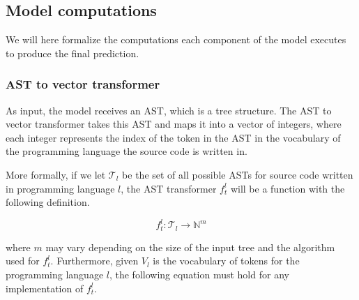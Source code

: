 \subsection{Model computations}
We will here formalize the computations each component of the model executes to
produce the final prediction.
\subsubsection{AST to vector transformer}
As input, the model receives an AST, which is a tree structure. The AST to
vector transformer takes this AST and maps it into a vector of integers, where
each integer represents the index of the token in the AST in the vocabulary of
the programming language the source code is written in.

More formally, if we let $\mathcal{T}_l$ be the set of all possible ASTs for
source code written in programming language $l$, the AST transformer $f_t^l$ will
be a function with the following definition.

\begin{equation}
  f_t^l : \mathcal{T}_l \rightarrow \mathbb{N}^m
\end{equation}

where $m$ may vary depending on the size of the input tree and the algorithm
used for $f_t^l$. Furthermore, given $V_l$ is the vocabulary of tokens for the
programming language $l$, the following equation must hold for any
implementation of $f_t^l$.

